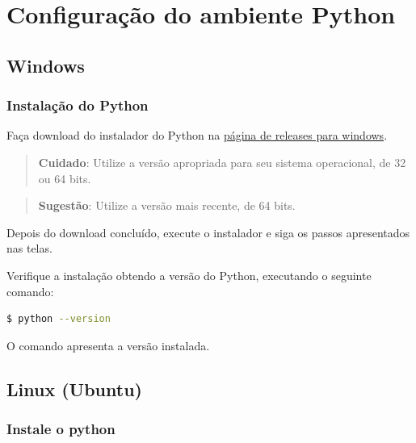 \documentclass[brazil,a4paper,oneside,openright,parskip=full]{book}
\begin{document}
\appendix

\hypertarget{sec:apendice-1}{%
\chapter{Configuração do ambiente Python}\label{sec:apendice-1}}

\hypertarget{windows}{%
\section{Windows}\label{windows}}

\hypertarget{instalauxe7uxe3o-do-python}{%
\subsection{Instalação do Python}\label{instalauxe7uxe3o-do-python}}

Faça download do instalador do Python na
\href{https://www.python.org/downloads/windows/}{página de releases para
windows}.

\begin{quote}
\textbf{Cuidado}: Utilize a versão apropriada para seu sistema
operacional, de 32 ou 64 bits.
\end{quote}

\begin{quote}
\textbf{Sugestão}: Utilize a versão mais recente, de 64 bits.
\end{quote}

Depois do download concluído, execute o instalador e siga os passos
apresentados nas telas.

Verifique a instalação obtendo a versão do Python, executando o seguinte
comando:

\begin{lstlisting}[language=sh, style=nonumber]
$ python --version
\end{lstlisting}

O comando apresenta a versão instalada.

\hypertarget{linux-ubuntu}{%
\section{Linux (Ubuntu)}\label{linux-ubuntu}}

\hypertarget{instale-o-python}{%
\subsection{Instale o python}\label{instale-o-python}}
\end{document}
